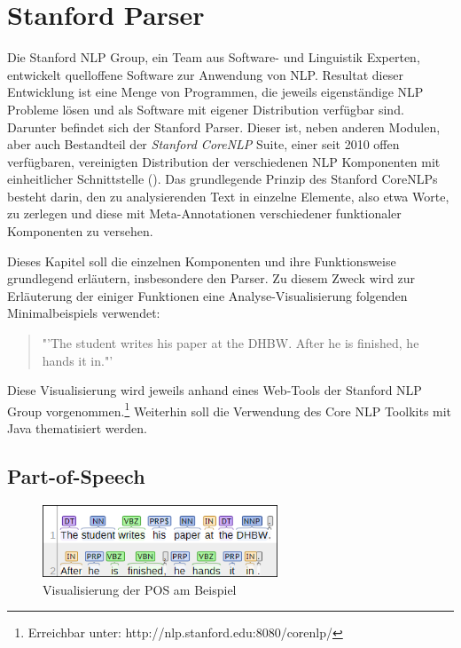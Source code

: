 \section{Stanford Parser}
\label{sec:stanfordparser}

Die Stanford \ac{NLP} Group, ein Team aus Software- und Linguistik Experten, entwickelt quelloffene Software zur Anwendung von \ac{NLP}. Resultat dieser Entwicklung ist eine Menge von Programmen, die jeweils eigenständige \ac{NLP} Probleme lösen und als Software mit eigener Distribution verfügbar sind. Darunter befindet sich der Stanford Parser. Dieser ist, neben anderen Modulen, aber auch Bestandteil der \textit{Stanford CoreNLP} Suite, einer seit 2010 offen verfügbaren, vereinigten Distribution der verschiedenen \ac{NLP} Komponenten mit einheitlicher Schnittstelle (\cite[vgl.][1 ff.]{STANFORDNLP}). Das grundlegende Prinzip des Stanford CoreNLPs besteht darin, den zu analysierenden Text in einzelne Elemente, also etwa Worte, zu zerlegen und diese mit Meta-Annotationen verschiedener funktionaler Komponenten zu versehen.\par
Dieses Kapitel soll die einzelnen Komponenten und ihre Funktionsweise grundlegend erläutern, insbesondere den Parser. Zu diesem Zweck wird zur Erläuterung der einiger Funktionen eine Analyse-Visualisierung folgenden Minimalbeispiels verwendet:
\begin{quote}
"'The student writes his paper at the DHBW. After he is finished, he hands it in."'
\end{quote} Diese Visualisierung wird jeweils anhand eines Web-Tools der Stanford \ac{NLP} Group vorgenommen.\footnote{Erreichbar unter: http://nlp.stanford.edu:8080/corenlp/} Weiterhin soll die Verwendung des Core NLP Toolkits mit Java thematisiert werden. 

\subsection{Part-of-Speech}
\label{subsec:pos}

\begin{figure}
\includegraphics[width=7cm]{pictures/POS.png}
\caption{Visualisierung der POS am Beispiel}
\label{fig:POS}
\end{figure}

